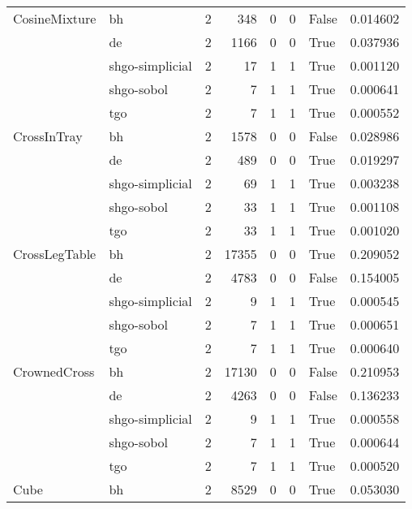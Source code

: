 \begin{longtable}{llrrrrlr}
CosineMixture & bh &     2 &      348 &      0 &       0 &   False &    0.014602 \\
         & de &     2 &     1166 &      0 &       0 &    True &    0.037936 \\
         & shgo-simplicial &     2 &       17 &      1 &       1 &    True &    0.001120 \\
         & shgo-sobol &     2 &        7 &      1 &       1 &    True &    0.000641 \\
         & tgo &     2 &        7 &      1 &       1 &    True &    0.000552 \\
CrossInTray & bh &     2 &     1578 &      0 &       0 &   False &    0.028986 \\
         & de &     2 &      489 &      0 &       0 &    True &    0.019297 \\
         & shgo-simplicial &     2 &       69 &      1 &       1 &    True &    0.003238 \\
         & shgo-sobol &     2 &       33 &      1 &       1 &    True &    0.001108 \\
         & tgo &     2 &       33 &      1 &       1 &    True &    0.001020 \\
CrossLegTable & bh &     2 &    17355 &      0 &       0 &    True &    0.209052 \\
         & de &     2 &     4783 &      0 &       0 &   False &    0.154005 \\
         & shgo-simplicial &     2 &        9 &      1 &       1 &    True &    0.000545 \\
         & shgo-sobol &     2 &        7 &      1 &       1 &    True &    0.000651 \\
         & tgo &     2 &        7 &      1 &       1 &    True &    0.000640 \\
CrownedCross & bh &     2 &    17130 &      0 &       0 &   False &    0.210953 \\
         & de &     2 &     4263 &      0 &       0 &   False &    0.136233 \\
         & shgo-simplicial &     2 &        9 &      1 &       1 &    True &    0.000558 \\
         & shgo-sobol &     2 &        7 &      1 &       1 &    True &    0.000644 \\
         & tgo &     2 &        7 &      1 &       1 &    True &    0.000520 \\
Cube & bh &     2 &     8529 &      0 &       0 &    True &    0.053030 \\

\end{longtable}
